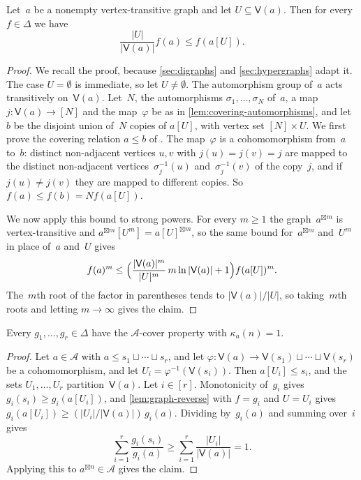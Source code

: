 \documentclass[11pt,letterpaper]{article}
\begin{document}
\begin{lemma}\label{lem:graph-reverse}
Let~$a$ be a nonempty vertex-transitive graph and let $U \subseteq \mathsf{V}(a)$. Then for every $f \in \Delta$ we have
\[
\frac{|U|}{|\mathsf{V}(a)|} f(a) \leq f(a[U]).
\]
\end{lemma}
\begin{proof}
We recall the proof, because \cref{sec:digraphs} and \cref{sec:hypergraphs} adapt it. The case $U = \emptyset$ is immediate, so let $U \neq \emptyset$. The automorphism group of~$a$ acts transitively on~$\mathsf{V}(a)$. Let~$N$, the automorphisms $\sigma_1, \ldots, \sigma_N$ of~$a$, a map $j : \mathsf{V}(a) \to [N]$ and the map~$\varphi$ be as in \cref{lem:covering-automorphisms}, and let~$b$ be the disjoint union of~$N$ copies of $a[U]$, with vertex set $[N] \times U$. We first prove the covering relation $a \leq b$ of \cite[Lemma~3.1]{MR4357434}. The map~$\varphi$ is a cohomomorphism from~$a$ to~$b$: distinct non-adjacent vertices $u, v$ with $j(u) = j(v) = j$ are mapped to the distinct non-adjacent vertices~$\sigma_j^{-1}(u)$ and~$\sigma_j^{-1}(v)$ of the copy~$j$, and if $j(u) \neq j(v)$ they are mapped to different copies. So $f(a) \leq f(b) = N f(a[U])$.

We now apply this bound to strong powers. For every $m \geq 1$ the graph~$a^{\boxtimes m}$ is vertex-transitive and $a^{\boxtimes m}[U^m] = a[U]^{\boxtimes m}$, so the same bound for~$a^{\boxtimes m}$ and~$U^m$ in place of~$a$ and~$U$ gives
\[
f(a)^m \leq \Bigl( \frac{|\mathsf{V}(a)|^m}{|U|^m}\, m \ln |\mathsf{V}(a)| + 1 \Bigr) f(a[U])^m.
\]
The~$m$th root of the factor in parentheses tends to $|\mathsf{V}(a)|/|U|$, so taking~$m$th roots and letting $m \to \infty$ gives the claim.
\end{proof}

\begin{lemma}\label{lem:graph-cover}
Every $g_1, \ldots, g_r \in \Delta$ have the $\mathcal{A}$-cover property with $\kappa_a(n) = 1$.
\end{lemma}
\begin{proof}
Let $a \in \mathcal{A}$ with $a \leq s_1 \sqcup \cdots \sqcup s_r$, and let $\varphi : \mathsf{V}(a) \to \mathsf{V}(s_1) \sqcup \cdots \sqcup \mathsf{V}(s_r)$ be a cohomomorphism, and let $U_i = \varphi^{-1}(\mathsf{V}(s_i))$. Then $a[U_i] \leq s_i$, and the sets $U_1, \ldots, U_r$ partition~$\mathsf{V}(a)$. Let $i \in [r]$. Monotonicity of~$g_i$ gives $g_i(s_i) \geq g_i(a[U_i])$, and \cref{lem:graph-reverse} with $f = g_i$ and $U = U_i$ gives $g_i(a[U_i]) \geq (|U_i|/|\mathsf{V}(a)|)\, g_i(a)$. Dividing by~$g_i(a)$ and summing over~$i$ gives
\[
\sum_{i=1}^r \frac{g_i(s_i)}{g_i(a)} \geq \sum_{i=1}^r \frac{|U_i|}{|\mathsf{V}(a)|} = 1.
\]
Applying this to $a^{\boxtimes n} \in \mathcal{A}$ gives the claim.
\end{proof}
\end{document}
